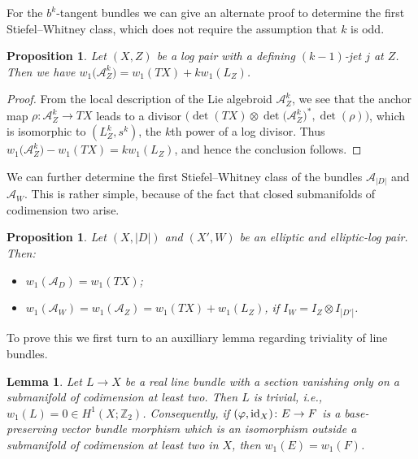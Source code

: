 \documentclass[10pt,a4paper]{amsart}
\numberwithin{equation}{section}
\newtheorem{Lemma}[Theorem]{Lemma}
\newtheorem{Proposition}[Theorem]{Proposition}
 { \theoremstyle{definition}
\newtheorem{Definition}[Theorem]{Definition}
\newtheorem{Example}[Theorem]{Example}
\newtheorem{Remark}[Theorem]{Remark} }
\begin{document}
For the $b^k$-tangent bundles we can give an alternate proof to determine the first Stiefel--Whitney class, which does not require the assumption that $k$ is odd.

\begin{Proposition}\label{prop:charclassesbk} Let $(X,Z)$ be a log pair with a defining $(k-1)$-jet $j$ at $Z$. Then we have $w_1\big(\mathcal{A}_Z^k\big) = w_1(TX) + k w_1(L_Z)$.
\end{Proposition}

\begin{proof} From the local description of the Lie algebroid $\mathcal{A}_Z^k$, we see that the anchor map $\rho\colon \mathcal{A}_Z^k \to TX$ leads to a divisor $\big(\det(TX)\otimes\det\big(\mathcal{A}_Z^k\big)^*, \det(\rho)\big)$, which is isomorphic to $(L_Z^k,s^k)$, the $k$th power of a log divisor. Thus $w_1\big(\mathcal{A}_Z^k\big) - w_1(TX) = k w_1(L_Z)$, and hence the conclusion follows.
\end{proof}

We can further determine the first Stiefel--Whitney class of the bundles $\mathcal{A}_{|D|}$ and $\mathcal{A}_W$. This is rather simple, because of the fact that closed submanifolds of codimension two arise.

\begin{Proposition}\label{prop:ellelllogw1} Let $(X,|D|)$ and $(X',W)$ be an elliptic and elliptic-log pair. Then:
	\begin{itemize}\itemsep=0pt
	\item $w_1(\mathcal{A}_D) = w_1(TX)$;
	\item $w_1(\mathcal{A}_W) = w_1(\mathcal{A}_Z) = w_1(TX) + w_1(L_{Z})$, if $I_W = I_{Z} \otimes I_{|D'|}$.
	\end{itemize}
\end{Proposition}

To prove this we first turn to an auxilliary lemma regarding triviality of line bundles.

\begin{Lemma}\label{lem:bundletriviality} Let $L \to X$ be a real line bundle with a section vanishing only on a submanifold of codimension at least two. Then $L$ is trivial, i.e., $w_1(L) = 0 \in H^1(X;\mathbb{Z}_2)$. Consequently, if $(\varphi,{\rm id}_X)\colon E \to F$ is a base-preserving vector bundle morphism which is an isomorphism outside a submanifold of codimension at least two in $X$, then $w_1(E) = w_1(F)$.
\end{Lemma}
\end{document}
